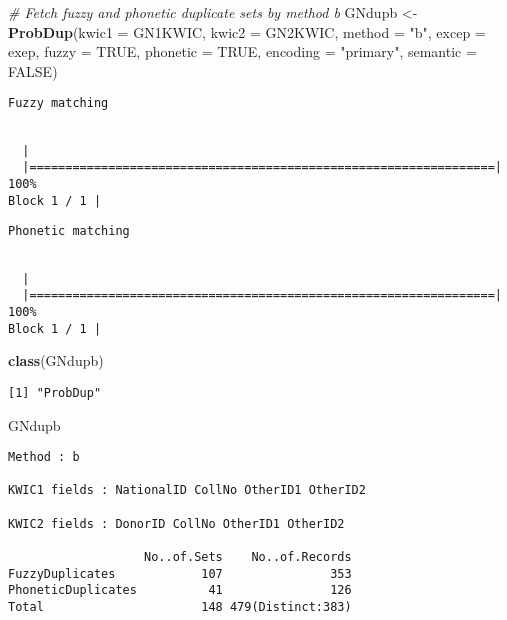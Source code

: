 \documentclass[]{article}
\newenvironment{Shaded}{\begin{snugshade}}{\end{snugshade}}
\newcommand{\CommentTok}[1]{\textcolor[rgb]{0.56,0.35,0.01}{\textit{#1}}}
\newcommand{\DataTypeTok}[1]{\textcolor[rgb]{0.13,0.29,0.53}{#1}}
\newcommand{\KeywordTok}[1]{\textcolor[rgb]{0.13,0.29,0.53}{\textbf{#1}}}
\newcommand{\NormalTok}[1]{#1}
\newcommand{\OtherTok}[1]{\textcolor[rgb]{0.56,0.35,0.01}{#1}}
\newcommand{\StringTok}[1]{\textcolor[rgb]{0.31,0.60,0.02}{#1}}
\begin{document}
\begin{Shaded}
\begin{Highlighting}[]
\CommentTok{# Fetch fuzzy and phonetic duplicate sets by method b}
\NormalTok{GNdupb <-}\StringTok{ }\KeywordTok{ProbDup}\NormalTok{(}\DataTypeTok{kwic1 =}\NormalTok{ GN1KWIC, }\DataTypeTok{kwic2 =}\NormalTok{ GN2KWIC, }\DataTypeTok{method =} \StringTok{"b"}\NormalTok{,}
                  \DataTypeTok{excep =}\NormalTok{ exep, }\DataTypeTok{fuzzy =} \OtherTok{TRUE}\NormalTok{, }\DataTypeTok{phonetic =} \OtherTok{TRUE}\NormalTok{,}
                  \DataTypeTok{encoding =} \StringTok{"primary"}\NormalTok{, }\DataTypeTok{semantic =} \OtherTok{FALSE}\NormalTok{)}
\end{Highlighting}
\end{Shaded}

\begin{verbatim}
Fuzzy matching
\end{verbatim}

\begin{verbatim}

  |                                                                       
  |=================================================================| 100%
Block 1 / 1 |
\end{verbatim}

\begin{verbatim}
Phonetic matching
\end{verbatim}

\begin{verbatim}

  |                                                                       
  |=================================================================| 100%
Block 1 / 1 |
\end{verbatim}

\begin{Shaded}
\begin{Highlighting}[]
\KeywordTok{class}\NormalTok{(GNdupb)}
\end{Highlighting}
\end{Shaded}

\begin{verbatim}
[1] "ProbDup"
\end{verbatim}

\begin{Shaded}
\begin{Highlighting}[]
\NormalTok{GNdupb}
\end{Highlighting}
\end{Shaded}

\begin{verbatim}
Method : b

KWIC1 fields : NationalID CollNo OtherID1 OtherID2

KWIC2 fields : DonorID CollNo OtherID1 OtherID2
 
                   No..of.Sets    No..of.Records
FuzzyDuplicates            107               353
PhoneticDuplicates          41               126
Total                      148 479(Distinct:383)
\end{verbatim}
\end{document}

